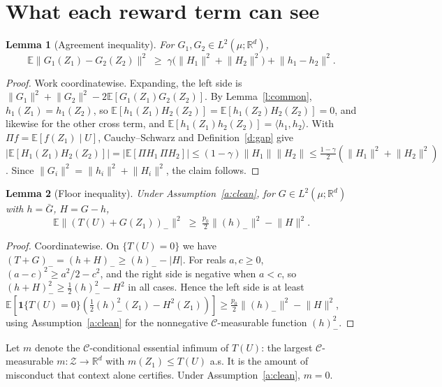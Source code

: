 \documentclass[11pt]{article}
\newtheorem{lemma}{Lemma}
\theoremstyle{definition}
\theoremstyle{remark}
\newcommand{\E}{\mathbb{E}}
\newcommand{\R}{\mathbb{R}}
\newcommand{\cC}{\mathcal{C}}
\newcommand{\cZ}{\mathcal{Z}}
\newcommand{\ip}[2]{\langle #1,#2\rangle}
\newcommand{\norm}[1]{\lVert #1\rVert}
\newcommand{\negp}[1]{(#1)_{-}}
\begin{document}
\section{What each reward term can see}\label{sec:see}

\begin{lemma}[Agreement inequality]\label{l:agree}
For $G_1,G_2\in L^2(\mu;\R^d)$,
\[
\E\norm{G_1(Z_1)-G_2(Z_2)}^2\;\ge\;\gamma\big(\norm{H_1}^2+\norm{H_2}^2\big)+\norm{h_1-h_2}^2 .
\]
\end{lemma}
\begin{proof}
Work coordinatewise. Expanding, the left side is $\norm{G_1}^2+\norm{G_2}^2-2\E[G_1(Z_1)G_2(Z_2)]$. By Lemma~\ref{l:common}, $h_1(Z_1)=h_1(Z_2)$, so $\E[h_1(Z_1)H_2(Z_2)]=\E[h_1(Z_2)H_2(Z_2)]=0$, and likewise for the other cross term, and $\E[h_1(Z_1)h_2(Z_2)]=\ip{h_1}{h_2}$. With $\Pi f=\E[f(Z_1)\mid U]$, Cauchy--Schwarz and Definition~\ref{d:gap} give
$|\E[H_1(Z_1)H_2(Z_2)]|=|\E[\Pi H_1\,\Pi H_2]|\le(1-\gamma)\norm{H_1}\norm{H_2}\le\tfrac{1-\gamma}{2}(\norm{H_1}^2+\norm{H_2}^2)$.
Since $\norm{G_i}^2=\norm{h_i}^2+\norm{H_i}^2$, the claim follows.
\end{proof}

\begin{lemma}[Floor inequality]\label{l:floor}
Under Assumption~\ref{a:clean}, for $G\in L^2(\mu;\R^d)$ with $h=\bar G$, $H=G-h$,
\[
\E\norm{\negp{T(U)+G(Z_1)}}^2\;\ge\;\tfrac{p_0}{2}\norm{\negp h}^2-\norm{H}^2 .
\]
\end{lemma}
\begin{proof}
Coordinatewise. On $\{T(U)=0\}$ we have $\negp{T+G}=\negp{h+H}\ge \negp h-|H|$. For reals $a,c\ge0$, $(a-c)^2\ge a^2/2-c^2$, and the right side is negative when $a<c$, so $\negp{h+H}^2\ge\tfrac12\negp h^2-H^2$ in all cases. Hence the left side is at least $\E[\mathbf 1\{T(U)=0\}(\tfrac12\negp{h}^2(Z_1)-H^2(Z_1))]\ge\tfrac{p_0}{2}\norm{\negp h}^2-\norm H^2$, using Assumption~\ref{a:clean} for the nonnegative $\cC$-measurable function $\negp h^2$.
\end{proof}

Let $m$ denote the $\cC$-conditional essential infimum of $T(U)$: the largest $\cC$-measurable $m:\cZ\to\R^d$ with $m(Z_1)\le T(U)$ a.s. It is the amount of misconduct that context alone certifies. Under Assumption~\ref{a:clean}, $m=0$.
\end{document}
